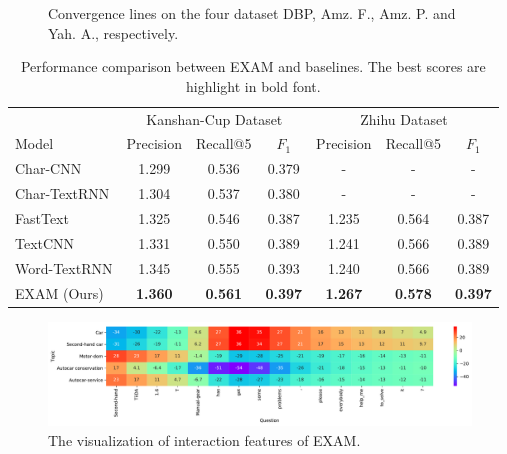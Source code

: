 \documentclass[letterpaper]{article} %
\begin{document}
\begin{figure}[!htb]
\caption{Convergence lines on the four dataset DBP, Amz. F., Amz. P. and Yah. A., respectively.}
\label{loss}
\end{figure}
\begin{table}
  \caption{Performance comparison between EXAM and baselines. The best scores are highlight in bold font.}
  \label{table}
  \centering
  \begin{tabular}{lcccccc}
    \toprule
     & \multicolumn{3}{c}{Kanshan-Cup Dataset} & \multicolumn{3}{c}{Zhihu Dataset} \\
    \cmidrule(r){2-4} \cmidrule(r){5-7}
    Model     &Precision & Recall@5 &$F_{1}$    &Precision & Recall@5 &$F_{1}$ \\
    \midrule
    Char-CNN \cite{charcnn} &1.299 & 0.536 &0.379  &- & - &-    \\
    Char-TextRNN \cite{TextRNN} &1.304 &0.537 &0.380  &- & - &-    \\
     \midrule
    FastText \cite{fasttext} &1.325 & 0.546 &0.387  &1.235 &0.564 &0.387 \\
    TextCNN \cite{TextCNN} &1.331 & 0.550 &0.389  &1.241 &0.566 &0.389    \\
    Word-TextRNN \cite{TextRNN} &1.345 & 0.555 &0.393  &1.240 &0.566  &0.389    \\
    EXAM (Ours) &\textbf{1.360} &\textbf{0.561} &\textbf{0.397} &\textbf{1.267}  &\textbf{0.578}  &\textbf{0.397}    \\
    \bottomrule
  \end{tabular}
\end{table}
\begin{figure}
\centering
\includegraphics[scale=0.5]{visual.pdf}
\caption{The visualization of interaction features of EXAM.}
\label{vis4text}
\end{figure}
\end{document}
